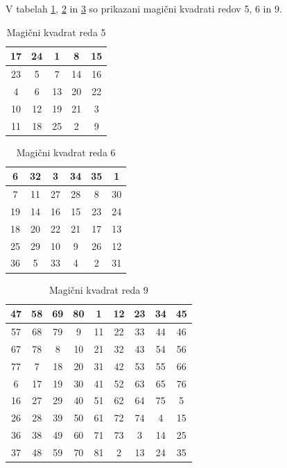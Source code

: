 \documentclass[a4paper,12pt]{article}
\theoremstyle{definition}
\theoremstyle{plain}
\newenvironment{magic}[3]{
   \begin{table}%
   \centering%
   \caption{#2}%
   \label{#3}%
   \large
   \begin{tabular}{|*{#1}{c|}}%
      \hline
}{
   \end{tabular}%
   \end{table}%
}
\begin{document}
V tabelah \ref{tab:Red5}, \ref{tab:Red6} in \ref{tab:Red9} so prikazani
magični kvadrati redov 5, 6 in 9.
\begin{magic}{5}{Magični kvadrat reda 5}{tab:Red5}
   17 & 24 &  1 &  8 & 15 \\\hline
   23 &  5 &  7 & 14 & 16 \\\hline
    4 &  6 & 13 & 20 & 22 \\\hline
   10 & 12 & 19 & 21 &  3 \\\hline
   11 & 18 & 25 &  2 &  9 \\\hline
\end{magic}
\begin{magic}{6}{Magični kvadrat reda 6}{tab:Red6}
    6 & 32 &  3 & 34 & 35 &  1 \\\hline
    7 & 11 & 27 & 28 &  8 & 30 \\\hline
   19 & 14 & 16 & 15 & 23 & 24 \\\hline
   18 & 20 & 22 & 21 & 17 & 13 \\\hline
   25 & 29 & 10 &  9 & 26 & 12 \\\hline
   36 &  5 & 33 &  4 &  2 & 31 \\\hline
\end{magic}
\begin{magic}{9}{Magični kvadrat reda 9}{tab:Red9}
   47 & 58 & 69 & 80 &  1 & 12 & 23 & 34 & 45 \\\hline
   57 & 68 & 79 &  9 & 11 & 22 & 33 & 44 & 46 \\\hline
   67 & 78 &  8 & 10 & 21 & 32 & 43 & 54 & 56 \\\hline
   77 &  7 & 18 & 20 & 31 & 42 & 53 & 55 & 66 \\\hline
    6 & 17 & 19 & 30 & 41 & 52 & 63 & 65 & 76 \\\hline
   16 & 27 & 29 & 40 & 51 & 62 & 64 & 75 &  5 \\\hline
   26 & 28 & 39 & 50 & 61 & 72 & 74 &  4 & 15 \\\hline
   36 & 38 & 49 & 60 & 71 & 73 &  3 & 14 & 25 \\\hline
   37 & 48 & 59 & 70 & 81 &  2 & 13 & 24 & 35 \\\hline
\end{magic}


\end{document}
